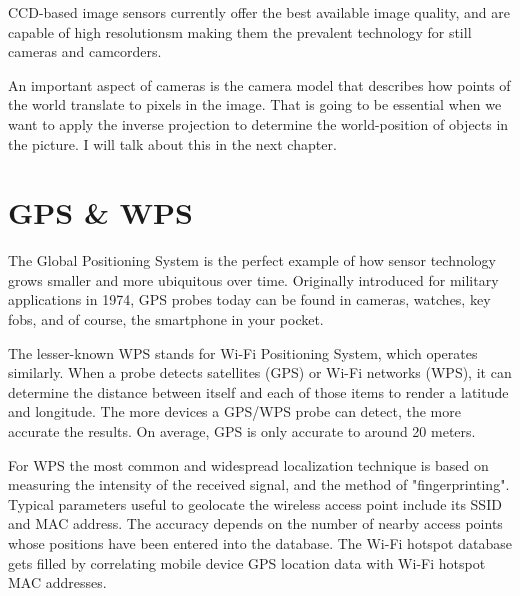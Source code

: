 CCD-based image sensors currently offer the best available image quality, and
are capable of high resolutionsm making them the prevalent technology for still
cameras and camcorders.

An important aspect of cameras is the camera model that describes how points of
the world translate to pixels in the image. That is going to be essential when
we want to apply the inverse projection to determine the world-position of
objects in the picture. I will talk about this in the next chapter. 


\section{GPS \& WPS}

The Global Positioning System is the perfect example of how sensor
technology grows smaller and more ubiquitous over time. Originally introduced
for military applications in 1974, GPS probes today can be found in cameras,
watches, key fobs, and of course, the smartphone in your pocket.

The lesser-known WPS stands for Wi-Fi Positioning System, which operates
similarly. When a probe detects satellites (GPS) or Wi-Fi networks (WPS), it can
determine the distance between itself and each of those items to render a
latitude and longitude. The more devices a GPS/WPS probe can detect, the more
accurate the results. On average, GPS is only accurate to around 20 meters.

For WPS the most common and widespread localization technique is based on
measuring the intensity of the received signal, and the method of
"fingerprinting". Typical parameters useful to geolocate the wireless access
point include its SSID and MAC address. The accuracy depends on the number of
nearby access points whose positions have been entered into the database. The
Wi-Fi hotspot database gets filled by correlating mobile device GPS location
data with Wi-Fi hotspot MAC addresses.